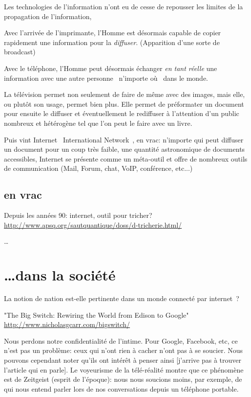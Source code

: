 Les technologies de l'information n'ont eu de cesse de repousser les limites de
la propagation de l'information, 

Avec l'arrivée de l'imprimante, l'Homme est désormais capable de copier
rapidement une information pour la \emph{diffuser}. (Apparition d'une sorte
de broadcast)

Avec le téléphone, l'Homme peut désormais échanger \emph{en tant réelle} une 
information avec une autre personne \og{}~n'importe où~\fg{} dans le monde.

La télévision permet non seulement de faire de même avec des images, mais elle,
ou plutôt son usage, permet bien plus. Elle permet de préformater un document pour ensuite le
diffuser et éventuellement le rediffuser à l'attention d'un public nombreux et
hétérogène tel que l'on peut le faire avec un livre.

Puis vint Internet \og{}~International Network~\fg{}, en vrac: n'importe qui
peut diffuser un document pour un coup très faible, une quantité astronomique
de documents accessibles, Internet se présente comme un méta-outil et offre de
nombreux outils de communication (Mail, Forum, chat, VoIP, conférence, etc...)

\subsection{en vrac}



Depuis les années 90: internet, outil pour tricher?
\url{http://www.apsq.org/sautquantique/doss/d-tricherie.html/}

\ldots

\section{\ldots dans la société}

La notion de nation est-elle pertinente dans un monde connecté par
internet~?

"The Big Switch: Rewiring the World from Edison to Google" 
 \url{http://www.nicholasgcarr.com/bigswitch/}

Nous perdons notre confidentialité de l'intime. Pour Google, Facebook, etc, 
ce n'est pas un problème: ceux qui n'ont rien à cacher n'ont pas à se soucier. Nous
pouvons cependant noter qu'ils ont intérêt à penser ainsi [j'arrive pas à 
trouver l'article qui en parle]. Le voyeurisme de la télé-réalité montre 
que ce phénomène est de Zeitgeist (esprit de l'époque): nous nous soucions 
moins, par exemple, de qui nous entend parler lors de nos
conversations depuis un téléphone portable.

